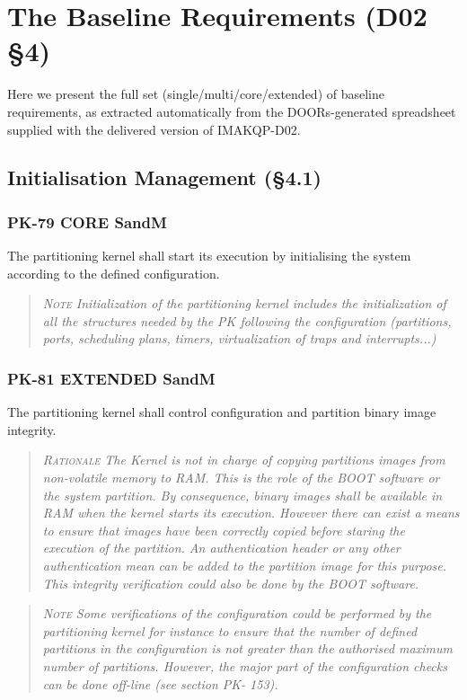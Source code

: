 \section{The Baseline Requirements (D02 \S4)}

\def\ReqmtHdr#1#2#3{\subsubsection*{#1 #2 #3}}

Here we present the full set (single/multi/core/extended)
of baseline requirements, as extracted automatically from
the DOORs-generated spreadsheet supplied
with the delivered version of IMAKQP-D02.

\subsection{Initialisation Management (\S4.1)}

\ReqmtHdr{PK-79}{CORE}{SandM}
The partitioning kernel shall start its execution by initialising the system according to the defined configuration.
\begin{quote}\it
\textsc{Note}
Initialization of the partitioning kernel includes the initialization of all the structures needed by the PK following the configuration (partitions, ports, scheduling plans, timers, virtualization of traps and interrupts...)
\end{quote}

\ReqmtHdr{PK-81}{EXTENDED}{SandM}
The partitioning kernel shall control configuration and partition binary image integrity.
\begin{quote}\it
\textsc{Rationale}
The Kernel is not in charge of copying partitions images from non-volatile memory to RAM. This is the role of the BOOT software or the system partition. By consequence, binary images shall be available in RAM when the kernel starts its execution. However there can exist a means to ensure that images have been correctly copied before staring the execution of the partition. An authentication header or any other authentication mean can be added to the partition image for this purpose. This integrity verification could also be done by the BOOT software.
\end{quote}
\begin{quote}\it
\textsc{Note}
Some verifications of the configuration could be performed by the partitioning kernel for instance to ensure that the number of defined partitions in the configuration is not greater than the authorised maximum number of partitions. However, the major part of the configuration checks can be done off-line (see section PK- 153).
\end{quote}

